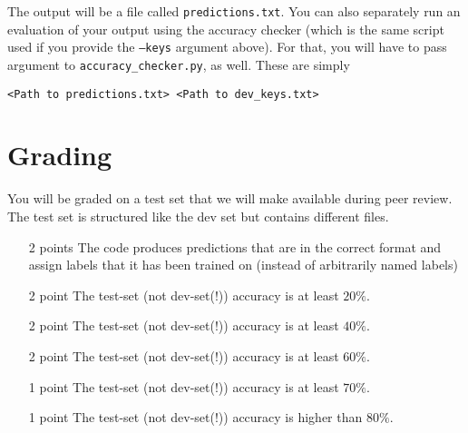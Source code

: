 \documentclass[11pt, a4paper]{article}
\begin{document}
The output will be a file called \texttt{predictions.txt}. You can also separately run an evaluation of your output using the
accuracy checker (which is the same script used if you provide the \texttt{--keys} argument above). 
For that, you will have to pass argument to \texttt{accuracy\_checker.py}, as well. These
are simply
\begin{center}
\texttt{<Path to predictions.txt> <Path to dev\_keys.txt>}
\end{center} 

\section{Grading}
You will be graded on a test set that we will make available during peer review. The test set
is structured like the dev set but contains different files.
\begin{itemize}
\item[2 points] The code produces predictions that are in the correct format and assign labels that
it has been trained on (instead of arbitrarily named labels)
\item[2 point] The test-set (not dev-set(!)) accuracy is at least $ 20\% $.
\item[2 point] The test-set (not dev-set(!)) accuracy is at least $ 40\% $.
\item[2 point] The test-set (not dev-set(!)) accuracy is at least $ 60\% $.
\item[1 point] The test-set (not dev-set(!)) accuracy is at least $ 70\% $.
\item[1 point] The test-set (not dev-set(!)) accuracy is higher than $ 80\% $.
\end{itemize}
\end{document}
